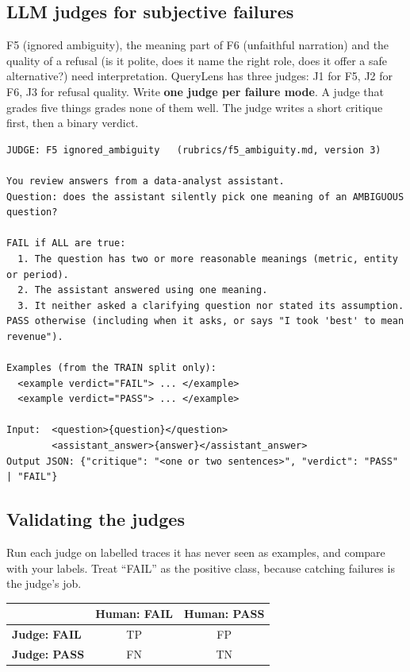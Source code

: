 \documentclass[11pt,a4paper]{article}
\begin{document}
\subsection{LLM judges for subjective failures}

F5 (ignored ambiguity), the meaning part of F6 (unfaithful narration) and the quality of a refusal (is it polite, does it name the right role, does it offer a safe alternative?) need interpretation. QueryLens has three judges: J1 for F5, J2 for F6, J3 for refusal quality.
Write \textbf{one judge per failure mode}. A judge that grades five things grades none of them
well. The judge writes a short critique first, then a binary verdict.

\begin{lstlisting}
JUDGE: F5 ignored_ambiguity   (rubrics/f5_ambiguity.md, version 3)

You review answers from a data-analyst assistant.
Question: does the assistant silently pick one meaning of an AMBIGUOUS question?

FAIL if ALL are true:
  1. The question has two or more reasonable meanings (metric, entity or period).
  2. The assistant answered using one meaning.
  3. It neither asked a clarifying question nor stated its assumption.
PASS otherwise (including when it asks, or says "I took 'best' to mean revenue").

Examples (from the TRAIN split only):
  <example verdict="FAIL"> ... </example>
  <example verdict="PASS"> ... </example>

Input:  <question>{question}</question>
        <assistant_answer>{answer}</assistant_answer>
Output JSON: {"critique": "<one or two sentences>", "verdict": "PASS" | "FAIL"}
\end{lstlisting}

\subsection{Validating the judges}

Run each judge on labelled traces it has never seen as examples, and compare with your labels.
Treat ``FAIL'' as the positive class, because catching failures is the judge's job.

\begin{center}
\begin{tabular}{@{}l c c@{}}
\toprule
& \textbf{Human: FAIL} & \textbf{Human: PASS}\\
\midrule
\textbf{Judge: FAIL} & TP & FP\\
\textbf{Judge: PASS} & FN & TN\\
\bottomrule
\end{tabular}
\end{center}
\end{document}

